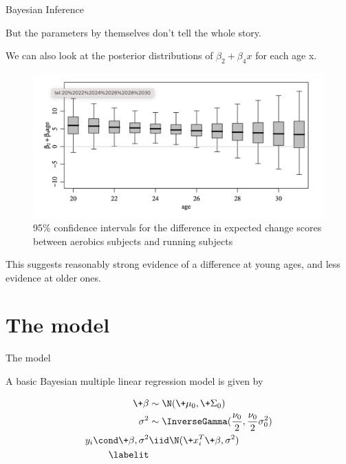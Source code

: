 \documentclass[10pt]{beamer}
\begin{document}
\begin{frame}{Bayesian Inference}
	
But the parameters by themselves don't tell the whole story. 

We can also look at the posterior distributions of $\beta_2 + \beta_4 x$ for each age x. 

 \begin{figure}
\centering
\includegraphics[width=.8\textwidth]{images/hoff_exercise_program_posteriors_by_age}
\caption{95\% confidence intervals for the difference in expected change scores between aerobics subjects and running subjects}
\end{figure}

This suggests reasonably strong evidence of a difference at young ages, and less evidence at older ones.

\end{frame}


\section{The model}

\begin{frame}{The model}

A basic Bayesian multiple linear regression model is given by

\vfill

\begin{align*}
\+\beta &\sim \N(\+\mu_0,  \+\Sigma_0) \\
\sigma^2 &\sim \InverseGamma (\frac{\nu_0}{2}, \frac{\nu_0}{2} \sigma_0^2) \\
y_{i} \cond \+\beta, \sigma^2 &\iid \N(\+x_{i}^T \+\beta, \sigma^2) \\
\labelit \label{eqn:linear_regression}
\end{align*}

\end{frame}

\end{document}
